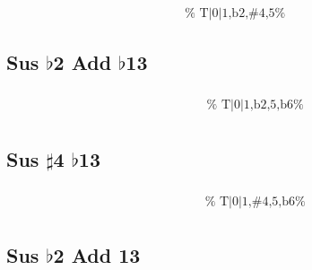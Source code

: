 \documentclass[english]{./gbook}
\begin{document}
\begin{large}
\[\begin{array}{ll}
&
	\text{
	}
\end{array}
\]



\subsection*{Sus $\flat$2 Add $\flat$13}

\[
\begin{array}{ll}
	\begin{array}{c}
		\begin{array}{ccc}
			&%
			&%
		\end{array}
		\\
		\begin{array}{cc}
			&%
		\end{array}
	\end{array}

&
	\text{
	}
\end{array}
\]

\subsection*{Sus $\sharp$4 $\flat$13}

\[
\begin{array}{ll}
	\begin{array}{c}
		\begin{array}{ccc}
			&%
			&%
		\end{array}
		\\
		\begin{array}{cc}
			&%
		\end{array}
	\end{array}

&
	\text{
	}
\end{array}
\]

\subsection*{Sus $\flat$2 Add 13}

\[
\begin{array}{ll}
	\begin{array}{c}
		\begin{array}{ccc}
			&%
			&%
		\end{array}
		\\
		\begin{array}{cc}
			&%
		\end{array}
	\end{array}


\end{array}\]
\end{large}
\end{document}
